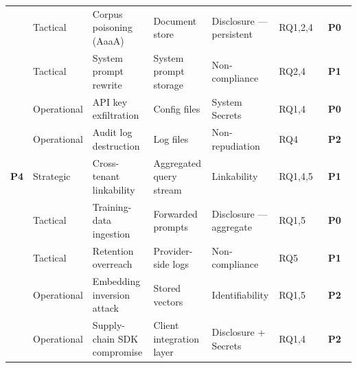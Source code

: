 \documentclass[a4paper,12pt]{report}
\newcommand{\prioHigh}{\colorbox{prioP0}{\color{white}\small\textbf{~\textsf{P0}~}}}
\newcommand{\prioMed}{\colorbox{prioP1}{\color{white}\small\textbf{~\textsf{P1}~}}}
\newcommand{\prioLow}{\colorbox{prioP2}{\color{white}\small\textbf{~\textsf{P2}~}}}
\begin{document}
\begin{longtable}{
    L{1.7cm}
    L{1.3cm}
    L{2.3cm}
    L{3.2cm}
    L{2.2cm}
    C{0.9cm}
    C{0.9cm}
  }
  \small
    & \small Tactical
    & \small Corpus poisoning (AaaA)
    & \small Document store
    & \small Disclosure --- persistent
    & \small RQ1,2,4
    & \small \prioHigh \\

  \small
    & \small Tactical
    & \small System prompt rewrite
    & \small System prompt storage
    & \small Non-compliance
    & \small RQ2,4
    & \small \prioMed \\

  \small
    & \small Operational
    & \small API key exfiltration
    & \small Config files
    & \small System Secrets
    & \small RQ1,4
    & \small \prioHigh \\

  \small
    & \small Operational
    & \small Audit log destruction
    & \small Log files
    & \small Non-repudiation
    & \small RQ4
    & \small \prioLow \\

  \midrule

  \small\textbf{P4}
    & \small Strategic
    & \small Cross-tenant linkability
    & \small Aggregated query stream
    & \small Linkability
    & \small RQ1,4,5
    & \small \prioMed \\

  \small
    & \small Tactical
    & \small Training-data ingestion
    & \small Forwarded prompts
    & \small Disclosure --- aggregate
    & \small RQ1,5
    & \small \prioHigh \\

  \small
    & \small Tactical
    & \small Retention overreach
    & \small Provider-side logs
    & \small Non-compliance
    & \small RQ5
    & \small \prioMed \\

  \small
    & \small Operational
    & \small Embedding inversion attack
    & \small Stored vectors
    & \small Identifiability
    & \small RQ1,5
    & \small \prioLow \\

  \small
    & \small Operational
    & \small Supply-chain SDK compromise
    & \small Client integration layer
    & \small Disclosure + Secrets
    & \small RQ1,4
    & \small \prioLow \\

  \bottomrule
\end{longtable}
\end{document}
